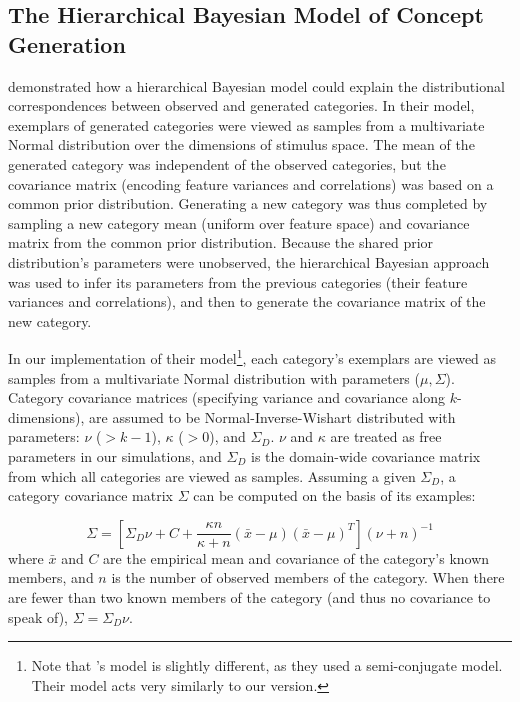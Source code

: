 \documentclass[pdflatex,sn-apa]{sn-jnl}%
\theoremstyle{thmstyleone}%
\theoremstyle{thmstyletwo}%
\theoremstyle{thmstylethree}%
\begin{document}
\begin{appendices}

    
\section{The Hierarchical Bayesian Model of Concept Generation}
\label{ap:hsampling-definition}

\cite{jern2013probabilistic} demonstrated how a hierarchical Bayesian model
could explain the distributional correspondences between observed and generated
categories. In their model, exemplars of generated categories were viewed as
samples from a multivariate Normal distribution over the dimensions of stimulus
space. The mean of the generated category was independent of the observed
categories, but the covariance matrix (encoding feature variances and
correlations) was based on a common prior distribution. Generating a new
category was thus completed by sampling a new category mean (uniform over
feature space) and covariance matrix from the common prior distribution.
Because the shared prior distribution's parameters were unobserved, the
hierarchical Bayesian approach was used to infer its parameters from the
previous categories (their feature variances and correlations), and then to
generate the covariance matrix of the new category.

In our implementation of their model\footnote{Note that
\citet{jern2013probabilistic}'s model is slightly different, as they used a
semi-conjugate model. Their model acts very similarly to our version.}, each
category's exemplars are viewed as samples from a multivariate Normal
distribution with parameters ($\mu, \Sigma$). Category covariance matrices
(specifying variance and covariance along $k$-dimensions), are assumed to be
Normal-Inverse-Wishart distributed with parameters: $\nu$ ($>k-1$), $\kappa$
($>0$), and $\Sigma_D$. $\nu$ and $\kappa$ are treated as free parameters in our
simulations, and $\Sigma_D$ is the domain-wide covariance matrix from which all
categories are viewed as samples. Assuming a given $\Sigma_D$, a category
covariance matrix $\Sigma$ can be computed on the basis of its examples:

\begin{equation} \Sigma = \left[ \Sigma_D \nu + C + \dfrac {\kappa n} {\kappa +
n} (\bar{x}-\mu)(\bar{x}-\mu)^T \right] (\nu + n)^{-1}
\label{eq:Sigma_B}
\end{equation}
% 
where $\bar{x}$ and $C$ are the empirical mean and covariance of the category's
known members, and $n$ is the number of observed members of the category. When
there are fewer than two known members of the category (and thus no covariance
to speak of), $\Sigma = \Sigma_D\nu$.


\end{appendices}
\end{document}
